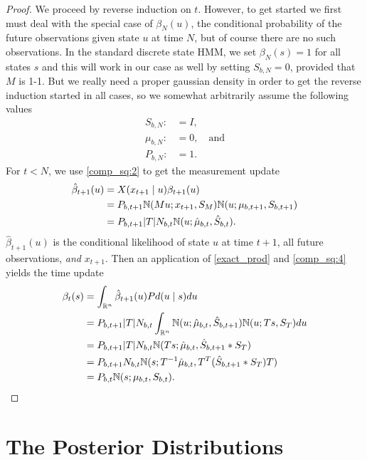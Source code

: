 \documentclass[12pt,leqno]{article}
\begin{document}
\begin{proof}
We proceed by reverse induction on $t$. However, to get started we first must  deal with
the special case of $\beta_{N}(u)$, the conditional probability of the future observations given
state $u$ at time $N$, but of course there are no such observations.  In the standard discrete
state HMM, we set $\beta_N(s) = 1$ for all states $s$ and this will work in our case as well by
setting $S_{b,N} = 0$, provided that $M$ is 1-1. But we really need a proper gaussian 
density in order to get the reverse induction started in all cases, so we somewhat arbitrarily
assume the following values
\begin{align*}
  S_{b,N} :&= I,\\
  \mu_{b,N} :&= 0,\quad\text{and}\\
  P_{b,N} :&= 1.
\end{align*}
  For $t <  N$, we use \eqref{comp_sq:2} to get the measurement update 
  \begin{align*}
    \hat{\beta}_{t+1}(u) &= X(x_{t+1}\mid u)\beta_{t+1}(u)\\
    &= P_{b,t+1}{\mathbb N}(Mu;x_{t+1},S_M){\mathbb N}(u;\mu_{b,t+1},S_{b,t+1})\\
    &= P_{b,t+1}|T|N_{b,t}{\mathbb N}(u;\hat{\mu}_{b,t},\hat{S}_{b,t}).
  \end{align*}
  $\hat{\beta}_{t+1}(u)$ is the conditional likelihood of state $u$ at time $t+1$, all future observations, {\em and}
  $x_{t+1}$. Then an application of \eqref{exact_prod} and \eqref{comp_sq:4} yields the time update
  \begin{align*}
    \beta_t(s) &= \int_{{\mathbb R}^n}\hat{\beta}_{t+1}(u)Pd(u\mid s)du \\
    &= P_{b,t+1}|T|N_{b,t}\int_{{\mathbb R}^n}{\mathbb N}(u;\hat{\mu}_{b,t},\hat{S}_{b,t+1}){\mathbb N}(u;Ts,S_T)du\\
    &=P_{b,t+1}|T|N_{b,t}{\mathbb N}(Ts;\hat{\mu}_{b,t},\hat{S}_{b,t+1}*S_T)\\
    &=P_{b,t+1}N_{b,t}{\mathbb N}(s;T^{-1}\hat{\mu}_{b,t},T^T(\hat{S}_{b,t+1}*S_T)T)\\
    &=P_{b,t}{\mathbb N}(s;\mu_{b,t},S_{b,t}).
  \end{align*}
\end{proof}
\newpage
\section{The Posterior Distributions}
\end{document}
